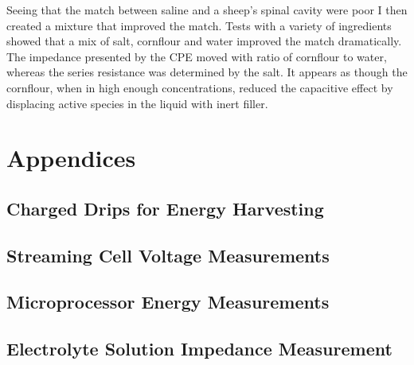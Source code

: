     Seeing that the match between saline and a sheep's spinal cavity were poor I then created a mixture that improved the match.
    Tests with a variety of ingredients showed that a mix of salt, cornflour and water improved the match dramatically.
    The impedance presented by the CPE moved with ratio of cornflour to water, whereas the series resistance was determined by the salt.
    It appears as though the cornflour, when in high enough concentrations, reduced the capacitive effect by displacing active species in the liquid with inert filler.



 \part{Appendices}

   \appendix

   \chapter{Charged Drips for Energy Harvesting}
     \label{appendix:chargedDropletts}
     

   \chapter{Streaming Cell Voltage Measurements}
     \label{appendix:streamingCellMeasurements}
     

   \chapter{Microprocessor Energy Measurements}
     

   \chapter{Electrolyte Solution Impedance Measurement}
     


